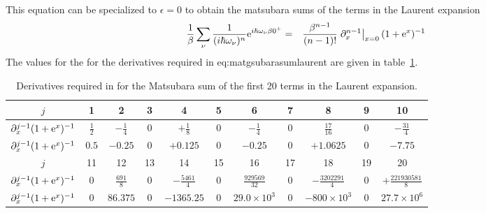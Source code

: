 \documentclass[11pt,a4paper]{report}
\begin{document}
This equation can be specialized to $\epsilon=0$ to obtain the
matsubara sums of the terms in the Laurent expansion
\begin{eqnarray}
\frac{1}{\beta}\sum_\nu \frac{1}{(i\hbar\omega_\nu)^n}\mathrm{e}^{i\hbar\omega_\nu\beta0^+}
&=&\frac{\beta^{n-1}}{(n-1)!}
\left.\partial_x^{n-1}\right|_{x=0}(1+\mathrm{e}^{x})^{-1}
\label{eq:matgsubarasumlaurent}
\end{eqnarray}
 The values for the for the derivatives required in {eq:matgsubarasumlaurent} are given in 
 table~\ref{tab:matsubarasumlaurent}.

\begin{table}[h!bt]
\begin{center}
\begin{tabular}{|c|c|c|c|c|c|c|c|c|c|c|}
\hline
$j$& 1 & 2 & 3 & 4 & 5 &6 &7 &8 & 9 & 10\\
\hline
$\partial^{j-1}_x(1+\mathrm{e}^{x})^{-1}$
&$\frac{1}{2}$ 
&$-\frac{1}{4}$ 
&$0$ 
&$+\frac{1}{8}$ 
&$0$ 
&$-\frac{1}{4}$ 
&$0$ 
&$\frac{17}{16}$
&$0$ 
&$-\frac{31}{4}$
\\
\hline
$\partial^{j-1}_x(1+\mathrm{e}^{x})^{-1}$
&$0.5$ 
&$-0.25$ 
&$0$ 
&$+0.125$ 
&$0$ 
&$-0.25$ 
&$0$ 
&$+1.0625$
&$0$ 
&$-7.75$
\\
\hline
\hline
$j$& 11 & 12 & 13 & 14 & 15 &16 &17 &18 & 19 & 20\\
\hline
$\partial^{j-1}_x(1+\mathrm{e}^{x})^{-1}$
&$0$ 
&$\frac{691}{8}$ 
&$0$ 
&$-\frac{5461}{4}$ 
&$0$ 
&$\frac{929569}{32}$ 
&$0$ 
&$-\frac{3202291}{4}$
&$0$ 
&$+\frac{221930581}{8}$
\\
\hline
$\partial^{j-1}_x(1+\mathrm{e}^{x})^{-1}$
&$0$ 
&$86.375$ 
&$0$ 
&$-1365.25$ 
&$0$ 
&$29.0\times10^3$ 
&$0$ 
&$-800\times10^3$
&$0$ 
&$27.7\times 10^6$ %
\\
\hline
\end{tabular}
\end{center}
\caption{\label{tab:matsubarasumlaurent} Derivatives required in
   for the Matsubara sum of the first
  20 terms in the Laurent expansion.}
\end{table}
\end{document}

